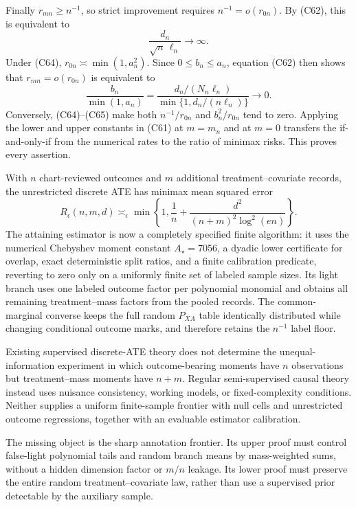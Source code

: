 Finally \(r_{mn}\ge n^{-1}\), so strict improvement requires \(n^{-1}=o(r_{0n})\).  By (C62), this is equivalent to
\[
 \frac{d_n}{\sqrt n\,\ell_n}\longrightarrow\infty.               \tag{C64}
\]
Under (C64), \(r_{0n}\asymp\min(1,a_n^2)\).  Since \(0\le b_n\le a_n\), equation (C62) then shows that \(r_{mn}=o(r_{0n})\) is equivalent to
\[
 \frac{b_n}{\min(1,a_n)}
 =\frac{d_n/(N_n\ell_n)}{\min\{1,d_n/(n\ell_n)\}}\longrightarrow0. \tag{C65}
\]
Conversely, (C64)--(C65) make both \(n^{-1}/r_{0n}\) and \(b_n^2/r_{0n}\) tend to zero.  Applying the lower and upper constants in (C61) at \(m=m_n\) and at \(m=0\) transfers the if-and-only-if from the numerical rates to the ratio of minimax risks.  This proves every assertion.

With \(n\) chart-reviewed outcomes and \(m\) additional treatment--covariate records, the unrestricted discrete ATE has minimax mean squared error
\[
 R_\epsilon(n,m,d)\asymp_\epsilon
 \min\!\left\{1,\frac1n+\frac{d^2}{(n+m)^2\log^2(en)}\right\}.
\]
The attaining estimator is now a completely specified finite algorithm: it uses the numerical Chebyshev moment constant \(A_\star=7056\), a dyadic lower certificate for overlap, exact deterministic split ratios, and a finite calibration predicate, reverting to zero only on a uniformly finite set of labeled sample sizes.  Its light branch uses one labeled outcome factor per polynomial monomial and obtains all remaining treatment--mass factors from the pooled records.  The common-marginal converse keeps the full random \(P_{XA}\) table identically distributed while changing conditional outcome marks, and therefore retains the \(n^{-1}\) label floor.

Existing supervised discrete-ATE theory does not determine the unequal-information experiment in which outcome-bearing moments have \(n\) observations but treatment--mass moments have \(n+m\).  Regular semi-supervised causal theory instead uses nuisance consistency, working models, or fixed-complexity conditions.  Neither supplies a uniform finite-sample frontier with null cells and unrestricted outcome regressions, together with an evaluable estimator calibration.

The missing object is the sharp annotation frontier.  Its upper proof must control false-light polynomial tails and random branch means by mass-weighted sums, without a hidden dimension factor or \(m/n\) leakage.  Its lower proof must preserve the entire random treatment--covariate law, rather than use a supervised prior detectable by the auxiliary sample.

